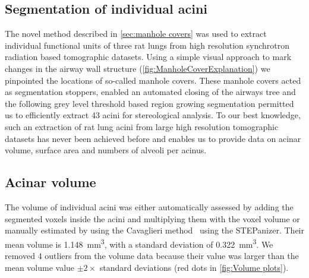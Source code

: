 \documentclass[a4paper,DIV=calc,abstract,english]{scrartcl}
\newcommand{\numberofacini}{43}
\newcommand{\numberofoutliers}{4} %
\newcommand{\biggerthan}{2} %
\newcommand{\meanacinarvolume}{1.148} %
\newcommand{\meanacinarvolumeSTD}{0.322} %
\begin{document}
\subsection{Segmentation of individual acini}
The novel method described in \autoref{sec:manhole covers} was used to extract individual functional units of three rat lungs from high resolution synchrotron radiation based tomographic datasets.
Using a simple visual approach to mark changes in the airway wall structure (\autoref{fig:ManholeCoverExplanation}) we pinpointed the locations of  so-called manhole covers.
These manhole covers acted as segmentation stoppers, enabled an automated closing of the airways tree and the following grey level threshold based region growing segmentation permitted us to efficiently extract \numberofacini\xspace acini for stereological analysis.
To our best knowledge, such an extraction of rat lung acini from large high resolution tomographic datasets has never been achieved before and enables us to provide data on acinar volume, surface area and numbers of alveoli per acinus.

\subsection{Acinar volume}
The volume of individual acini was either automatically assessed by adding the segmented voxels inside the acini and multiplying them with the voxel volume or manually estimated by using the Cavaglieri method~\cite{Hsia2010} using the STEPanizer.
Their mean volume is \SI{\meanacinarvolume}{\milli\meter\cubed}, with a standard deviation of \SI{\meanacinarvolumeSTD}{\milli\meter\cubed}. We removed \numberofoutliers\xspace outliers from the volume data because their value was larger than the mean volume value \(\pm\biggerthan\times\) standard deviations (red dots in \autoref{fig:Volume plots}).
\end{document}
